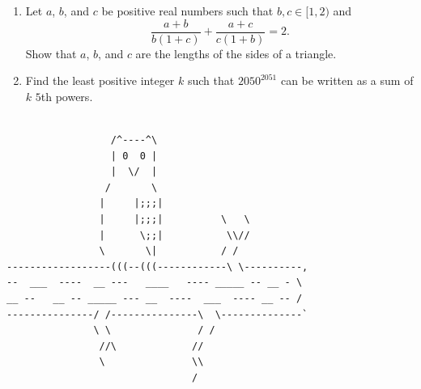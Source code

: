 \documentclass{article}
\begin{document}
\begin{enumerate}[1.]
		\item %
		Let $a$, $b$, and $c$ be positive real numbers such that $b, c \in [1,2)$ and
		\[ \frac{a+b}{b(1+c)} +\frac{a+c}{c(1+b)} = 2. \]
		Show that $a$, $b$, and $c$ are the lengths of the sides of a triangle.
		\vspace{6.81mm}

		\item %
		Find the least positive integer $k$ such that $2050^{2051}$ can be written as a sum of $k$ $5$th powers.

			
	\end{enumerate}
	
	
\vfill
\begin{center}
\begin{BVerbatim}

                  /^----^\
                  | 0  0 |
                  |  \/  |
                 /       \
                |     |;;;|
                |     |;;;|          \   \
                |      \;;|           \\//
                \       \|           / /
------------------(((--(((------------\ \----------,
--  ___  ----  __ ---   ____   ---- _____ -- __ - \
__ --   __ -- _____ --- __  ----  ___  ---- __ -- /
---------------/ /---------------\  \--------------`
               \ \               / /
                //\             //
                \               \\
                                /

\end{BVerbatim}
\end{center}
	
\end{document}
